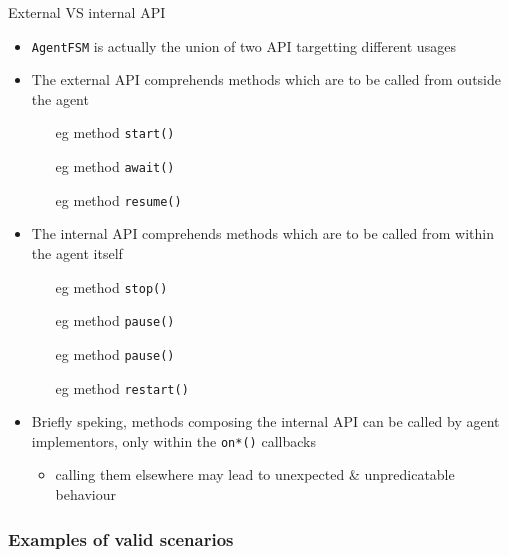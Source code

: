 \documentclass[presentation]{beamer}\mode<presentation>{\usetheme{AMSCesenaPurpleAndGold}}
\begin{document}
\begin{frame}{External VS internal API}

\begin{itemize}
    \item \texttt{AgentFSM} is actually the union of two API targetting different usages
    
    \vfill
    
    \item The \alert{external} API comprehends methods which are to be called \alert{from outside} the agent
    \begin{itemize}
        \item[eg] method \texttt{\alert{start()}}
        \item[eg] method \texttt{\alert{await()}}
        \item[eg] method \texttt{\alert{resume()}}
    \end{itemize}
    
    \vfill
    
    \item The \alert{internal} API comprehends methods which are to be called \alert{from within} the agent itself
    \begin{itemize}
        \item[eg] method \texttt{\alert{stop()}}
        \item[eg] method \texttt{\alert{pause()}}
        \item[eg] method \texttt{\alert{pause()}}
        \item[eg] method \texttt{\alert{restart()}}
    \end{itemize}
    
    \vfill
    
    \item Briefly speking, methods composing the \alert{internal} API can be called by agent implementors, \alert{only} within the \texttt{on*()} callbacks
    \begin{itemize}
        \item calling them elsewhere may lead to unexpected \& unpredicatable behaviour
    \end{itemize}
\end{itemize}

\end{frame}

\subsubsection{Examples of valid scenarios}
\end{document}
